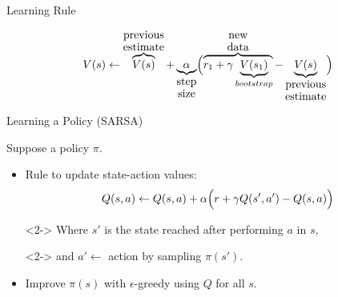 \documentclass[11pt]{beamer}
\begin{document}
\begin{frame}{Learning Rule}

\[
V(s) \gets \overbrace{V(s)}^{\txt{previous\\estimate}} + \underbrace{\alpha}_{\txt{step\\size}}\Bigl(\overbrace{r_1 + \gamma \underbrace{V(s_1)}_{bootstrap}}^{\txt{new\\data}} - \underbrace{V(s)}_{\txt{previous\\estimate}}\Bigr)
\]

\end{frame}

\begin{frame}{Learning a Policy (SARSA)}

Suppose a policy $\pi$.

\vspace{.5\baselineskip}

\begin{itemize}
\item<2-> Rule to update state-action values:
%
\[
Q(s,a) \gets Q(s,a) + \alpha\Bigl(r + \gamma Q(s',a') - Q(s,a)\Bigr)
\]
%
\item[]<2-> Where $s'$ is the state reached after performing $a$ in $s$,
\item[]<2-> and $a'\gets$ action by sampling $\pi(s')$.

\item<3-> Improve $\pi(s)$ with $\epsilon$-greedy using $Q$ for all $s$.

\end{itemize}

\end{frame}
\end{document}
